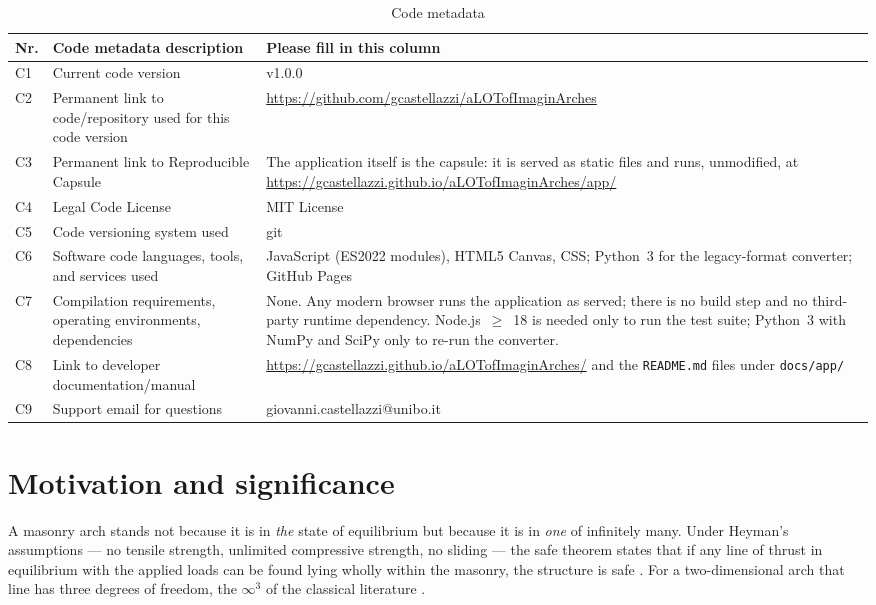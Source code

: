 \documentclass[final,3p,times,twocolumn]{elsarticle}
\begin{document}
\begin{table}[t]
\footnotesize
\centering
\caption{Code metadata}
\label{tab:metadata}

\begin{tabular}{@{}p{}p{}p{}@{}}
\toprule
\textbf{Nr.} & \textbf{Code metadata description} & \textbf{Please fill in this column} \\
\midrule
C1 & Current code version & v1.0.0 \\
C2 & Permanent link to code/repository used for this code version &
     \url{https://github.com/gcastellazzi/aLOTofImaginArches} \\
C3 & Permanent link to Reproducible Capsule &
     The application itself is the capsule: it is served as static files and
     runs, unmodified, at
     \url{https://gcastellazzi.github.io/aLOTofImaginArches/app/} \\
C4 & Legal Code License & MIT License \\
C5 & Code versioning system used & git \\
C6 & Software code languages, tools, and services used &
     JavaScript (ES2022 modules), HTML5 Canvas, CSS; Python~3 for the
     legacy-format converter; GitHub Pages \\
C7 & Compilation requirements, operating environments, dependencies &
     None. Any modern browser runs the application as served; there is no
     build step and no third-party runtime dependency. Node.js~$\ge$~18 is
     needed only to run the test suite; Python~3 with NumPy and SciPy only to
     re-run the converter. \\
C8 & Link to developer documentation/manual &
     \url{https://gcastellazzi.github.io/aLOTofImaginArches/} and the
     \texttt{README.md} files under \texttt{docs/app/} \\
C9 & Support email for questions & giovanni.castellazzi@unibo.it \\
\bottomrule
\end{tabular}
\end{table}


\section{Motivation and significance}

A masonry arch stands not because it is in \emph{the} state of equilibrium but
because it is in \emph{one} of infinitely many. Under Heyman's assumptions ---
no tensile strength, unlimited compressive strength, no sliding ---
the safe theorem states that if any line of thrust in equilibrium with the
applied loads can be found lying wholly within the masonry, the structure is
safe \cite{Kooharian1952,Heyman1966,Heyman1982}. For a two-dimensional arch
that line has three degrees of freedom, the $\infty^3$ of the classical
literature \cite{Heyman1995,Huerta2001}.
\end{document}
